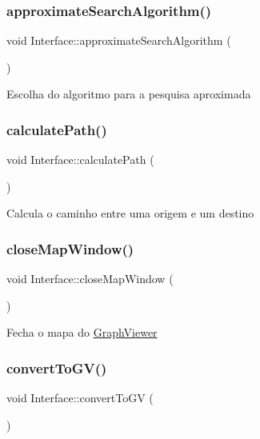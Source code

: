 \subsubsection{\texorpdfstring{approximate\+Search\+Algorithm()}{approximateSearchAlgorithm()}}
{\footnotesize\ttfamily void Interface\+::approximate\+Search\+Algorithm (\begin{DoxyParamCaption}{ }\end{DoxyParamCaption})}

Escolha do algoritmo para a pesquisa aproximada \mbox{\label{class_interface_ae4cad587f14fd078f118858ef2f73015}} 
\subsubsection{\texorpdfstring{calculate\+Path()}{calculatePath()}}
{\footnotesize\ttfamily void Interface\+::calculate\+Path (\begin{DoxyParamCaption}{ }\end{DoxyParamCaption})}

Calcula o caminho entre uma origem e um destino \mbox{\label{class_interface_a3afcfe1089d52a1359602dca26611657}} 
\subsubsection{\texorpdfstring{close\+Map\+Window()}{closeMapWindow()}}
{\footnotesize\ttfamily void Interface\+::close\+Map\+Window (\begin{DoxyParamCaption}{ }\end{DoxyParamCaption})}

Fecha o mapa do \mbox{\hyperlink{class_graph_viewer}{Graph\+Viewer}} \mbox{\label{class_interface_a04428812c5138654aaed3c17bc8f7deb}} 
\subsubsection{\texorpdfstring{convert\+To\+G\+V()}{convertToGV()}}
{\footnotesize\ttfamily void Interface\+::convert\+To\+GV (\begin{DoxyParamCaption}{ }\end{DoxyParamCaption})}

